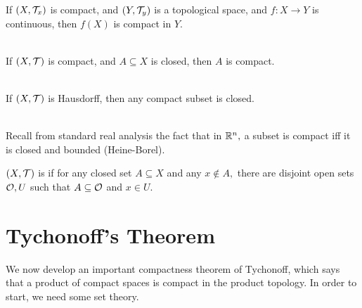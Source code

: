 \begin{prop}
If $(X,\mathcal{T}_x)$ is compact, and $(Y,\mathcal{T}_y)$ is a topological space, and $f:X\rightarrow Y$ is continuous, then $f(X)$ is compact in $Y.$ \\ \\
\end{prop}

\begin{prop}
If $(X,\mathcal{T})$ is compact, and $A\subseteq X$ is closed, then $A$ is compact. \\ \\
\end{prop}

\begin{prop}
If $(X,\mathcal{T})$ is Hausdorff, then any compact subset is closed. \\ \\
\end{prop}

\noindent Recall from standard real analysis the fact that in $\mathbb{R}^{n},$ a subset is compact iff it is closed and bounded (Heine-Borel).

\begin{defn}
$(X,\mathcal{T})$ is  if for any closed set $A\subseteq X$ and any $x\not\in A,$ there are disjoint open sets $\mathcal{O}, U$ such that $A\subseteq\mathcal{O}$ and $x\in U.$
\end{defn}

\section{Tychonoff's Theorem}
We now develop an important compactness theorem of Tychonoff, which says that a product of compact spaces is compact in the product topology. In order to start, we need some set theory.

